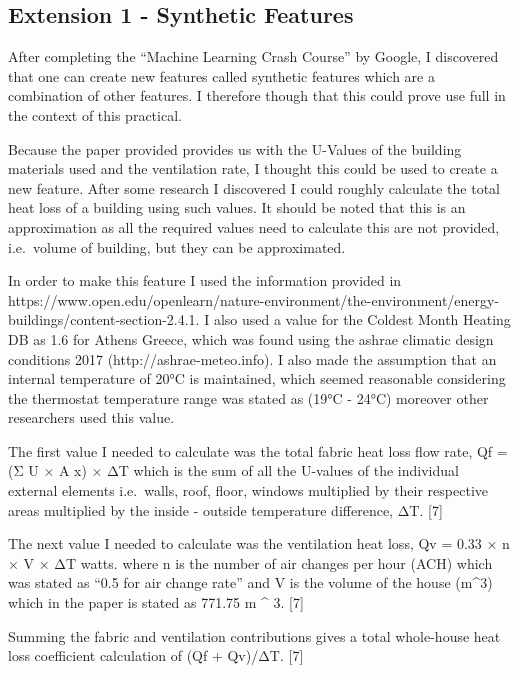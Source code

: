 \documentclass[11pt]{article}
\begin{document}
    
    \hypertarget{extension-1---synthetic-features}{%
\subsection{Extension 1 - Synthetic
Features}\label{extension-1---synthetic-features}}

After completing the ``Machine Learning Crash Course'' by Google, I
discovered that one can create new features called synthetic features
which are a combination of other features. I therefore though that this
could prove use full in the context of this practical.

Because the paper provided provides us with the U-Values of the building
materials used and the ventilation rate, I thought this could be used to
create a new feature. After some research I discovered I could roughly
calculate the total heat loss of a building using such values. It should
be noted that this is an approximation as all the required values need
to calculate this are not provided, i.e.~volume of building, but they
can be approximated.

In order to make this feature I used the information provided in
https://www.open.edu/openlearn/nature-environment/the-environment/energy-buildings/content-section-2.4.1.
I also used a value for the Coldest Month Heating DB as 1.6 for Athens
Greece, which was found using the ashrae climatic design conditions 2017
(http://ashrae-meteo.info). I also made the assumption that an internal
temperature of 20°C is maintained, which seemed reasonable considering
the thermostat temperature range was stated as (19°C - 24°C) moreover
other researchers used this value.

The first value I needed to calculate was the total fabric heat loss
flow rate, Qf = (Σ U × A x) × ΔT which is the sum of all the U-values of
the individual external elements i.e.~walls, roof, floor, windows
multiplied by their respective areas multiplied by the inside - outside
temperature difference, ΔT. {[}7{]}

The next value I needed to calculate was the ventilation heat loss, Qv =
0.33 × n × V × ΔT watts. where n is the number of air changes per hour
(ACH) which was stated as ``0.5 for air change rate'' and V is the
volume of the house (m\^{}3) which in the paper is stated as 771.75 m
\^{} 3. {[}7{]}

Summing the fabric and ventilation contributions gives a total
whole-house heat loss coefficient calculation of (Qf + Qv)/ΔT. {[}7{]}
\end{document}
